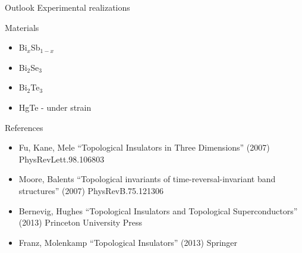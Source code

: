\documentclass[xcolor=x11names,compress,professionalfonts]{beamer}
\renewcommand{\(}{\begin{columns}}
\renewcommand{\)}{\end{columns}}
\newcommand{\<}[1]{\begin{column}{#1}}
\renewcommand{\>}{\end{column}}
\begin{document}
\begin{frame}{Outlook}
    Experimental realizations

    Materials
    \begin{itemize}
        \item Bi$_{x}$Sb$_{1 - x}$
        \item Bi$_2$Se$_3$
        \item Bi$_2$Te$_3$
        \item HgTe - under strain
    \end{itemize}
    
    
\end{frame}

\begin{frame}{References}

    \begin{itemize}
        \item Fu, Kane, Mele ``Topological Insulators in Three Dimensions'' (2007) PhysRevLett.98.106803
        \item Moore, Balents ``Topological invariants of time-reversal-invariant band structures'' (2007) PhysRevB.75.121306
        \item Bernevig, Hughes ``Topological Insulators and Topological Superconductors'' (2013) Princeton University Press
        \item Franz, Molenkamp ``Topological Insulators'' (2013) Springer
    \end{itemize}

\end{frame}
\end{document}

